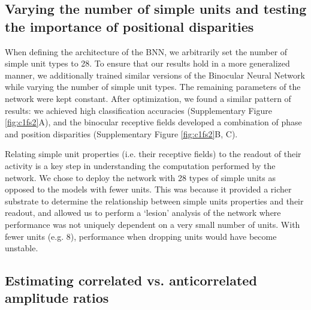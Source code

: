 \subsection*{Varying the number of simple units and testing the importance of positional disparities}

When defining the architecture of the BNN, we arbitrarily set the number of simple unit types to 28. To ensure that our results hold in a more generalized manner, we additionally trained similar versions of the Binocular Neural Network while varying the number of simple unit types. The remaining parameters of the network were kept constant. After optimization, we found a similar pattern of results: we achieved high classification accuracies (Supplementary Figure \ref{fig:c1fs2}A), and the binocular receptive fields developed a combination of phase and position disparities (Supplementary Figure \ref{fig:c1fs2}B, C). 

Relating simple unit properties (i.e. their receptive fields) to the readout of their activity is a key step in understanding the computation performed by the network. We chose to deploy the network with 28 types of simple units as opposed to the models with fewer units. This was because it provided a richer substrate to determine the relationship between simple units properties and their readout, and allowed us to perform a `lesion' analysis of the network where performance was not uniquely dependent on a very small number of units. With fewer units (e.g. 8), performance when dropping units would have become unstable.


\subsection*{Estimating correlated vs. anticorrelated amplitude ratios}

